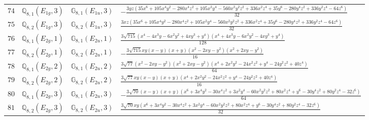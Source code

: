\documentclass[fleqn,8pt,landscape]{jsarticle}
\begin{document}
\begin{table}[ht!]
\begin{center}
\begin{tabular}{cccl}
$ 74 $ & $ \mathbb{Q}_{8,1}(E_{1g},3) $ & $ \mathbb{G}_{8,1}(E_{1u},3) $ & $ - \frac{3 y z \left(35 x^{6} + 105 x^{4} y^{2} - 280 x^{4} z^{2} + 105 x^{2} y^{4} - 560 x^{2} y^{2} z^{2} + 336 x^{2} z^{4} + 35 y^{6} - 280 y^{4} z^{2} + 336 y^{2} z^{4} - 64 z^{6}\right)}{32} $ \\
$ 75 $ & $ \mathbb{Q}_{8,2}(E_{1g},3) $ & $ \mathbb{G}_{8,2}(E_{1u},3) $ & $ \frac{3 x z \left(35 x^{6} + 105 x^{4} y^{2} - 280 x^{4} z^{2} + 105 x^{2} y^{4} - 560 x^{2} y^{2} z^{2} + 336 x^{2} z^{4} + 35 y^{6} - 280 y^{4} z^{2} + 336 y^{2} z^{4} - 64 z^{6}\right)}{32} $ \\
$ 76 $ & $ \mathbb{Q}_{8,1}(E_{2g},1) $ & $ \mathbb{G}_{8,1}(E_{2u},1) $ & $ \frac{3 \sqrt{715} \left(x^{4} - 4 x^{3} y - 6 x^{2} y^{2} + 4 x y^{3} + y^{4}\right) \left(x^{4} + 4 x^{3} y - 6 x^{2} y^{2} - 4 x y^{3} + y^{4}\right)}{128} $ \\
$ 77 $ & $ \mathbb{Q}_{8,2}(E_{2g},1) $ & $ \mathbb{G}_{8,2}(E_{2u},1) $ & $ - \frac{3 \sqrt{715} x y \left(x - y\right) \left(x + y\right) \left(x^{2} - 2 x y - y^{2}\right) \left(x^{2} + 2 x y - y^{2}\right)}{16} $ \\
$ 78 $ & $ \mathbb{Q}_{8,1}(E_{2g},2) $ & $ \mathbb{G}_{8,1}(E_{2u},2) $ & $ \frac{3 \sqrt{77} \left(x^{2} - 2 x y - y^{2}\right) \left(x^{2} + 2 x y - y^{2}\right) \left(x^{4} + 2 x^{2} y^{2} - 24 x^{2} z^{2} + y^{4} - 24 y^{2} z^{2} + 40 z^{4}\right)}{64} $ \\
$ 79 $ & $ \mathbb{Q}_{8,2}(E_{2g},2) $ & $ \mathbb{G}_{8,2}(E_{2u},2) $ & $ \frac{3 \sqrt{77} x y \left(x - y\right) \left(x + y\right) \left(x^{4} + 2 x^{2} y^{2} - 24 x^{2} z^{2} + y^{4} - 24 y^{2} z^{2} + 40 z^{4}\right)}{16} $ \\
$ 80 $ & $ \mathbb{Q}_{8,1}(E_{2g},3) $ & $ \mathbb{G}_{8,1}(E_{2u},3) $ & $ - \frac{3 \sqrt{70} \left(x - y\right) \left(x + y\right) \left(x^{6} + 3 x^{4} y^{2} - 30 x^{4} z^{2} + 3 x^{2} y^{4} - 60 x^{2} y^{2} z^{2} + 80 x^{2} z^{4} + y^{6} - 30 y^{4} z^{2} + 80 y^{2} z^{4} - 32 z^{6}\right)}{64} $ \\
$ 81 $ & $ \mathbb{Q}_{8,2}(E_{2g},3) $ & $ \mathbb{G}_{8,2}(E_{2u},3) $ & $ \frac{3 \sqrt{70} x y \left(x^{6} + 3 x^{4} y^{2} - 30 x^{4} z^{2} + 3 x^{2} y^{4} - 60 x^{2} y^{2} z^{2} + 80 x^{2} z^{4} + y^{6} - 30 y^{4} z^{2} + 80 y^{2} z^{4} - 32 z^{6}\right)}{32} $ \\
 \hline \hline
\end{tabular}
\end{center}
\end{table}
\end{document}
